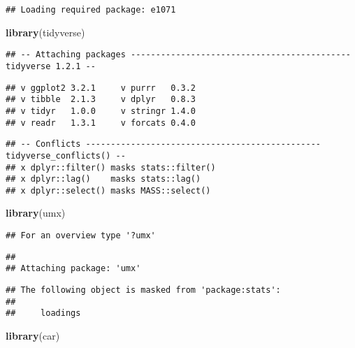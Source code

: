 \documentclass[11pt,]{article}
\newenvironment{Shaded}{\begin{snugshade}}{\end{snugshade}}
\newcommand{\KeywordTok}[1]{\textcolor[rgb]{0.13,0.29,0.53}{\textbf{#1}}}
\newcommand{\NormalTok}[1]{#1}
\begin{document}
\begin{verbatim}
## Loading required package: e1071
\end{verbatim}

\begin{Shaded}
\begin{Highlighting}[]
\KeywordTok{library}\NormalTok{(tidyverse)}
\end{Highlighting}
\end{Shaded}

\begin{verbatim}
## -- Attaching packages -------------------------------------------- tidyverse 1.2.1 --
\end{verbatim}

\begin{verbatim}
## v ggplot2 3.2.1     v purrr   0.3.2
## v tibble  2.1.3     v dplyr   0.8.3
## v tidyr   1.0.0     v stringr 1.4.0
## v readr   1.3.1     v forcats 0.4.0
\end{verbatim}

\begin{verbatim}
## -- Conflicts ----------------------------------------------- tidyverse_conflicts() --
## x dplyr::filter() masks stats::filter()
## x dplyr::lag()    masks stats::lag()
## x dplyr::select() masks MASS::select()
\end{verbatim}

\begin{Shaded}
\begin{Highlighting}[]
\KeywordTok{library}\NormalTok{(umx)}
\end{Highlighting}
\end{Shaded}

\begin{verbatim}
## For an overview type '?umx'
\end{verbatim}

\begin{verbatim}
## 
## Attaching package: 'umx'
\end{verbatim}

\begin{verbatim}
## The following object is masked from 'package:stats':
## 
##     loadings
\end{verbatim}

\begin{Shaded}
\begin{Highlighting}[]
\KeywordTok{library}\NormalTok{(car)}
\end{Highlighting}
\end{Shaded}
\end{document}
